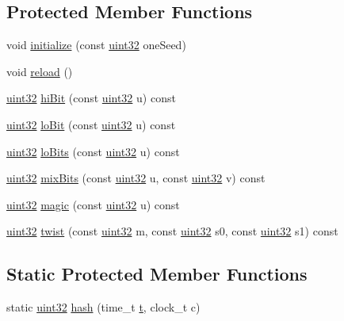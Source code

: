 \subsection*{Protected Member Functions}
\begin{DoxyCompactItemize}
\item 
void \hyperlink{classMTRand_a9b9a20998f5c805af6301ce5c37dcfc3}{initialize} (const \hyperlink{classMTRand_a45478edf9e24dcd2a5164bac3889d6a2}{uint32} oneSeed)
\item 
void \hyperlink{classMTRand_a1d5fcb69d83f4d2fd653883c8352f86c}{reload} ()
\item 
\hyperlink{classMTRand_a45478edf9e24dcd2a5164bac3889d6a2}{uint32} \hyperlink{classMTRand_a45eea926a0602e4bb5c0b90b04779826}{hiBit} (const \hyperlink{classMTRand_a45478edf9e24dcd2a5164bac3889d6a2}{uint32} u) const 
\item 
\hyperlink{classMTRand_a45478edf9e24dcd2a5164bac3889d6a2}{uint32} \hyperlink{classMTRand_a6f5a4a532e1c3acd42052046594205be}{loBit} (const \hyperlink{classMTRand_a45478edf9e24dcd2a5164bac3889d6a2}{uint32} u) const 
\item 
\hyperlink{classMTRand_a45478edf9e24dcd2a5164bac3889d6a2}{uint32} \hyperlink{classMTRand_ad846f81f7abfc1b20c51d1563b8e5d45}{loBits} (const \hyperlink{classMTRand_a45478edf9e24dcd2a5164bac3889d6a2}{uint32} u) const 
\item 
\hyperlink{classMTRand_a45478edf9e24dcd2a5164bac3889d6a2}{uint32} \hyperlink{classMTRand_abdd5587252ed1ac89cb274e4bf4881da}{mixBits} (const \hyperlink{classMTRand_a45478edf9e24dcd2a5164bac3889d6a2}{uint32} u, const \hyperlink{classMTRand_a45478edf9e24dcd2a5164bac3889d6a2}{uint32} v) const 
\item 
\hyperlink{classMTRand_a45478edf9e24dcd2a5164bac3889d6a2}{uint32} \hyperlink{classMTRand_a8539a48116c85704c5101981cb0823e7}{magic} (const \hyperlink{classMTRand_a45478edf9e24dcd2a5164bac3889d6a2}{uint32} u) const 
\item 
\hyperlink{classMTRand_a45478edf9e24dcd2a5164bac3889d6a2}{uint32} \hyperlink{classMTRand_acf32530212717166e3d02dd3cc0b68c4}{twist} (const \hyperlink{classMTRand_a45478edf9e24dcd2a5164bac3889d6a2}{uint32} m, const \hyperlink{classMTRand_a45478edf9e24dcd2a5164bac3889d6a2}{uint32} s0, const \hyperlink{classMTRand_a45478edf9e24dcd2a5164bac3889d6a2}{uint32} s1) const 
\end{DoxyCompactItemize}
\subsection*{Static Protected Member Functions}
\begin{DoxyCompactItemize}
\item 
static \hyperlink{classMTRand_a45478edf9e24dcd2a5164bac3889d6a2}{uint32} \hyperlink{classMTRand_a486885d03f38c844315d002e6312fa23}{hash} (time\_\-t \hyperlink{Main_8cpp_aa116c3492d6719f5f9213a5b26620b8d}{t}, clock\_\-t c)
\end{DoxyCompactItemize}
